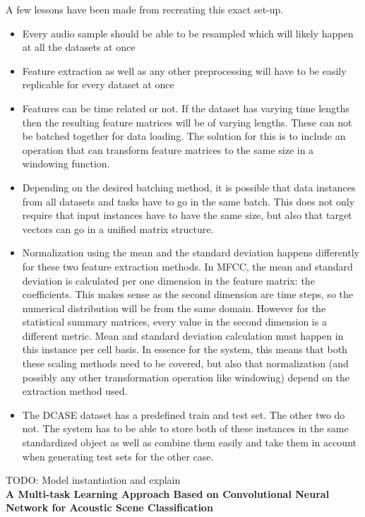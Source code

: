 A few lessons have been made from recreating this exact set-up. 

\begin{itemize}
	\item Every audio sample should be able to be resampled which will likely happen at all the datasets at once
	\item Feature extraction as well as any other preprocessing will have to be easily replicable for every dataset at once
	\item Features can be time related or not. If the dataset has varying time lengths then the resulting feature matrices will be of varying lengths. These can not be batched together for data loading. The solution for this is to include an operation that can transform feature matrices to the same size in a windowing function. 
	\item Depending on the desired batching method, it is possible that data instances from all datasets and tasks have to go in the same batch. This does not only require that input instances have to have the same size, but also that target vectors can go in a unified matrix structure.
	\item Normalization using the mean and the standard deviation happens differently for these two feature extraction methods. In MFCC, the mean and standard deviation is calculated per one dimension in the feature matrix: the coefficients. This makes sense as the second dimension are time steps, so the numerical distribution will be from the same domain. However for the statistical summary matrices, every value in the second dimension is a different metric. Mean and standard deviation calculation must happen in this instance per cell basis. In essence for the system, this means that both these scaling methods need to be covered, but also that normalization (and possibly any other transformation operation like windowing) depend on the extraction method used.
	\item The DCASE dataset has a predefined train and test set. The other two do not. The system has to be able to store both of these instances in the same standardized object as well as combine them easily and take them in account when generating test sets for the other case.
\end{itemize}


TODO: Model instantiation and explain \\


{\large \textbf{A Multi-task Learning Approach Based on Convolutional Neural Network for Acoustic Scene Classification}} \\

